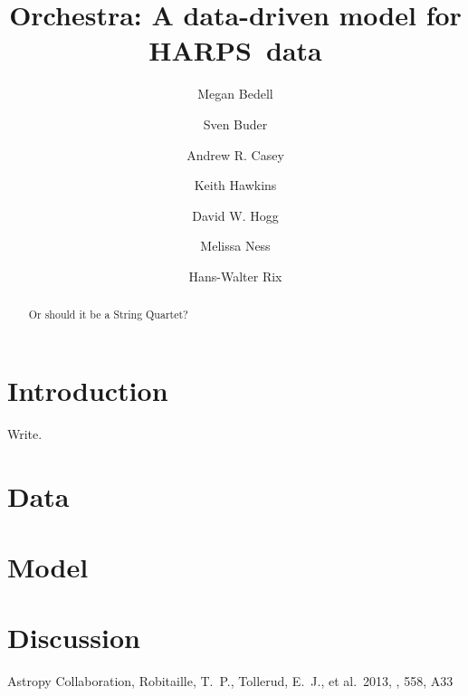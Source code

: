\documentclass{aastex61}
\newcommand{\acronym}[1]{{\small{#1}}}
\newcommand{\harps}{\acronym{HARPS}}
\begin{document}
\title{Orchestra: A data-driven model for \harps\ data}


\author{Megan Bedell}
\author{Sven Buder}
\author[0000-0003-0174-0564]{Andrew R. Casey}
\author{Keith Hawkins}
\author{David W. Hogg}
\author{Melissa Ness}
\author{Hans-Walter Rix}



\begin{abstract}
Or should it be a String Quartet?
\end{abstract}

\keywords{}

\section{Introduction} 
\label{sec:introduction}
Write.


\section{Data}
\label{sec:observations}


\section{Model}
\label{sec:model}



\section{Discussion}
\label{sec:discussion}


\acknowledgments



\begin{thebibliography}{}

 Astropy Collaboration, Robitaille, T.~P., Tollerud, E.~J., et al.\ 2013, \aap, 558, A33 

\end{thebibliography}
\end{document}
